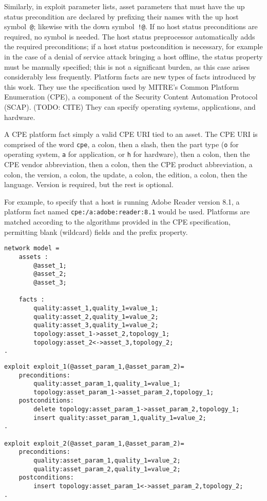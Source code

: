 Similarly, in exploit parameter lists, asset parameters that must have the
up status precondition are declared by prefixing their names with the up host 
symbol~\texttt{@}; likewise with the down symbol~\texttt{!@}. If no host
status preconditions are required, no symbol is needed. The host status
preprocessor automatically adds the required preconditions; if a host status
postcondition is necessary, for example in the case of a denial of service
attack bringing a host offline, the status property must be manually specified;
this is not a significant burden, as this case arises considerably less
frequently.
Platform facts are new types of facts introduced by this work. They use the
specification used by MITRE's Common Platform Enumeration (CPE), a component
of the Security Content Automation Protocol (SCAP). (TODO: CITE)
They can specify operating systems, applications, and hardware.

A CPE platform fact simply a valid CPE URI tied to an asset. The CPE URI is
comprised of the word \texttt{cpe}, a 
colon, then a slash, then the part type (\texttt{o} for operating system, \texttt{a} for
application, or \texttt{h} for hardware), then a colon, then the CPE vendor abbreviation,
then a colon, then the CPE product abbreviation, a colon, the version, a colon, the update, a colon, 
the edition, a colon, then the language. Version is required, but the rest is optional.

For example, to specify that a host is running Adobe Reader version 8.1, a 
platform fact named \texttt{cpe:/a:adobe:reader:8.1} would be used. Platforms
are matched according to the algorithms provided in the CPE specification,
permitting blank (wildcard) fields and the prefix property.
\begin{lstlisting}
network model = 
    assets :
        @asset_1;
        @asset_2;
        @asset_3;

    facts :
        quality:asset_1,quality_1=value_1;
        quality:asset_2,quality_1=value_2;        
        quality:asset_3,quality_1=value_2;
        topology:asset_1->asset_2,topology_1;
        topology:asset_2<->asset_3,topology_2;
.
\end{lstlisting}

\begin{lstlisting}
exploit exploit_1(@asset_param_1,@asset_param_2)=
    preconditions:
        quality:asset_param_1,quality_1=value_1;
        topology:asset_param_1->asset_param_2,topology_1;
    postconditions:
        delete topology:asset_param_1->asset_param_2,topology_1;
        insert quality:asset_param_1,quality_1=value_2;
.

exploit exploit_2(@asset_param_1,@asset_param_2)=
    preconditions:
        quality:asset_param_1,quality_1=value_2;
        quality:asset_param_2,quality_1=value_2;
    postconditions:
        insert topology:asset_param_1<->asset_param_2,topology_2;
.
\end{lstlisting}

